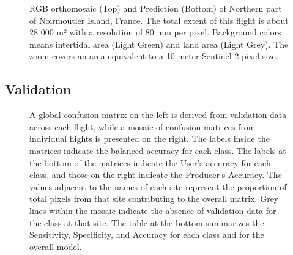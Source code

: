 \documentclass[
  number]{elsarticle}
\begin{document}
\label{cell-fig-Dike}
\begin{figure}[H]


\caption{\label{fig-Dike}RGB orthomosaic (Top) and Prediction (Bottom)
of Northern part of Noirmoutier Island, France. The total extent of this
flight is about 28 000 m² with a resolution of 80 mm per pixel.
Background colors means intertidal area (Light Green) and land area
(Light Grey). The zoom covers an area equivalent to a 10-meter
Sentinel-2 pixel size.}

\end{figure}%

\subsection{Validation}\label{validation-1}

\label{cell-fig-Validation}
\begin{figure}[H]


\caption{\label{fig-Validation}A global confusion matrix on the left is
derived from validation data across each flight, while a mosaic of
confusion matrices from individual flights is presented on the right.
The labels inside the matrices indicate the balanced accuracy for each
class. The labels at the bottom of the matrices indicate the User's
accuracy for each class, and those on the right indicate the Producer's
Accuracy. The values adjacent to the names of each site represent the
proportion of total pixels from that site contributing to the overall
matrix. Grey lines within the mosaic indicate the absence of validation
data for the class at that site. The table at the bottom summarizes the
Sensitivity, Specificity, and Accuracy for each class and for the
overall model.}

\end{figure}%
\end{document}

